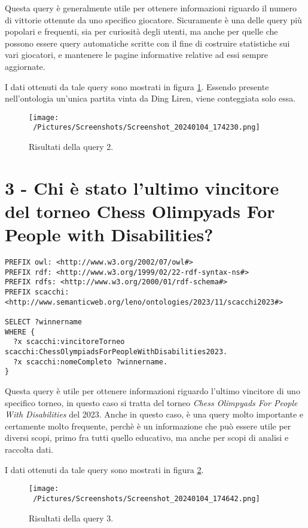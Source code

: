 \documentclass[12pt]{book}
\begin{document}
Questa query è generalmente utile per ottenere informazioni riguardo
il numero di vittorie ottenute da uno specifico giocatore. Sicuramente
è una delle query più popolari e frequenti, sia per curiosità degli
utenti, ma anche per quelle che possono essere query automatiche
scritte con il fine di costruire statistiche sui vari giocatori, e
mantenere le pagine informative relative ad essi sempre aggiornate.

I dati ottenuti da tale query sono mostrati in figura \ref{fig:query2}.
Essendo presente nell'ontologia un'unica partita vinta da Ding Liren,
viene conteggiata solo essa.

\begin{figure}[h]
  \caption{Risultati della query 2.}
  \centering
  \label{fig:query2}
  \texttt{[image: ~/Pictures/Screenshots/Screenshot\_20240104\_174230.png]}
\end{figure} 

\section{3 - Chi è stato l'ultimo vincitore del torneo Chess Olimpyads For
People with Disabilities?}

\begin{verbatim}
PREFIX owl: <http://www.w3.org/2002/07/owl#>
PREFIX rdf: <http://www.w3.org/1999/02/22-rdf-syntax-ns#>
PREFIX rdfs: <http://www.w3.org/2000/01/rdf-schema#>
PREFIX scacchi: <http://www.semanticweb.org/leno/ontologies/2023/11/scacchi2023#>

SELECT ?winnername
WHERE {
  ?x scacchi:vincitoreTorneo scacchi:ChessOlympiadsForPeopleWithDisabilities2023.
  ?x scacchi:nomeCompleto ?winnername.
}
\end{verbatim}

Questa query è utile per ottenere informazioni riguardo l'ultimo
vincitore di uno specifico torneo, in questo caso si tratta del torneo
\textit{Chess Olimpyads For People With Disabilities} del 2023. Anche
in questo caso, è una query molto importante e certamente molto
frequente, perchè è un informazione che può essere utile per diversi
scopi, primo fra tutti quello educativo, ma anche per scopi di analisi
e raccolta dati.

I dati ottenuti da tale query sono mostrati in figura \ref{fig:query3}.

\begin{figure}[h]
  \caption{Risultati della query 3.}
  \centering
  \label{fig:query3}
  \texttt{[image: ~/Pictures/Screenshots/Screenshot\_20240104\_174642.png]}
\end{figure} 
\end{document}
